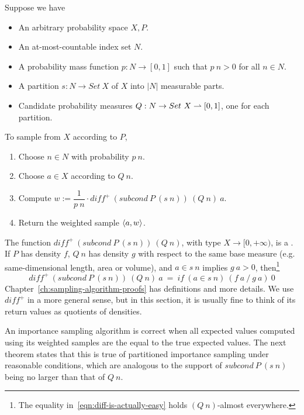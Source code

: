 \begin{definition}
\label{def:partitioned-importance-sampling}
Suppose we have
\begin{itemize}
	\item An arbitrary probability space $X,P$.
	\item An at-most-countable index set $N$.
	\item A probability mass function $p : N \to [0,1]$ such that $p~n > 0$ for all $n \in N$.
	\item A partition $s : N \to Set~X$ of $X$ into $|N|$ measurable parts.
	\item Candidate probability measures $Q : N \to Set~X \rightharpoonup [0,1]$, one for each partition.
\end{itemize}
To sample from $X$ according to $P$,
\begin{enumerate}
	\item Choose $n \in N$ with probability $p~n$.
	\item Choose $a \in X$ according to $Q~n$.
	\item Compute $w := \dfrac{1}{p~n} \cdot diff^+~(subcond~P~(s~n))~(Q~n)~a$.
	\item Return the weighted sample $\langle{a,w}\rangle$.
\end{enumerate}
\end{definition}

The function $diff^+~(subcond~P~(s~n))~(Q~n)$, with type $X \to [0,+\infty)$, is a .
If $P$ has density $f$, $Q~n$ has density $g$ with respect to the same base measure (e.g. same-dimensional length, area or volume), and $a \in s~n$ implies $g~a > 0$, then\footnote{The equality in~\eqref{eqn:diff-is-actually-easy} holds $(Q~n)$-almost everywhere.}
\begin{equation}
	diff^+~(subcond~P~(s~n))~(Q~n)~a\ =\ if~(a \in s~n)~(f~a~{/}~g~a)~0
\label{eqn:diff-is-actually-easy}
\end{equation}
Chapter~\ref{ch:sampling-algorithm-proofs} has definitions and more details.
We use $diff^+$ in a more general sense, but in this section, it is usually fine to think of its return values as quotients of densities.

An importance sampling algorithm is correct when all expected values computed using its weighted samples are the equal to the true expected values.
The next theorem states that this is true of partitioned importance sampling under reasonable conditions, which are analogous to the support of $subcond~P~(s~n)$ being no larger than that of $Q~n$.

